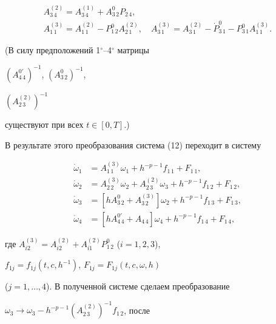 \begin{pf}
\begin{gather*}
A^{(2)}_{3\,4}=A^{(1)}_{3\,4}+A^0_{3\,2}P_{2\,4}, \\ 


% 


A^{(3)}_{1\,1}=A^{(2)}_{1\,1}-P^0_{1\,2}A^{(2)}_{2\,1},\quad 


A^{(3)}_{3\,1}=A^{(2)}_{3\,1}-\Dot P^0_{3\,1}- 


P^0_{3\,1}A^{(3)}_{1\,1}. 


\end{gather*} 


(В силу предположений 1${}^\circ$--4${}^\circ$ матрицы 


$(A^{0'}_{4\,4})^{-1}$, $(A^0_{3\,2})^{-1}$, 


$(A^{(2)}_{2\,3})^{-1}$ 


существуют при всех $t\in[0,T]$.) 


 


В результате этого преобразования система (12) переходит в систему 


\begin{equation} 


\begin{split} 


\Dot\omega_1 &=A^{(3)}_{1\,1}\omega_1+h^{-p-1}f_{1\,1}+F_{1\,1}, \\ 


\Dot\omega_2 &= A^{(3)}_{2\,2}\omega_2+A^{(2)}_{2\,3}\omega_3+ 


h^{-p-1}f_{1\,2}+F_{1\,2}, \\ 


\Dot\omega_3 &=[h A^0_{3\,2}+A^{(3)}_{3\,2}]\omega_2+ 


h^{-p-1}f_{1\,3}+F_{1\,3}, \\ 


\Dot\omega_4 &=[h A^{0'}_{4\,4}+A_{4\,4}]\omega_4+ 


h^{-p-1}f_{1\,4}+F_{1\,4}, 


\end{split} 


\end{equation} 


где $A^{(3)}_{i2}=A^{(2)}_{i2}+A^{(2)}_{i1}P^0_{1\,2}$ ($i=1,2,3$), 


$f_{1j}=f_{1j}(t,c,h^{-1})$, $F_{1j}=F_{1j}(t,c,\omega,h)$ 


($j=1,\dotsc,4$). В полученной системе сделаем преобразование 


$\omega_3\to\omega_3-h^{-p-1}(A^{(2)}_{2\,3})^{-1}f_{1\,2}$, после 



\end{pf}
